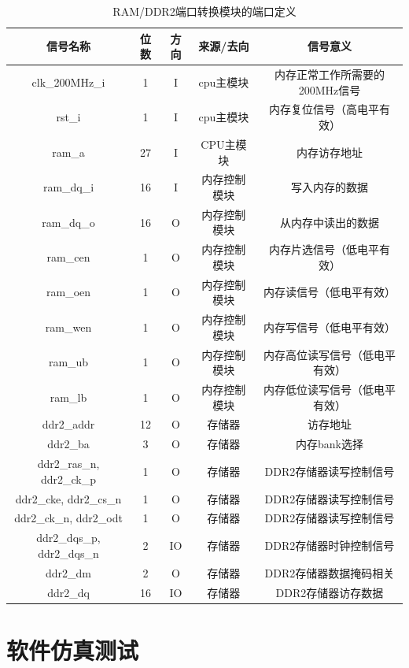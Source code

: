 \documentclass[forprint]{WHUBachelor}
\begin{document}
\begin{table}[H]
  \centering
  \begin{tabular}{c c c c c}
    \hline
    信号名称 & 位数 & 方向 & 来源/去向 & 信号意义 \\
    \hline
    clk\_200MHz\_i & 1 & I & cpu主模块 & 内存正常工作所需要的200MHz信号\\
    rst\_i & 1 & I & cpu主模块 & 内存复位信号（高电平有效）\\
    ram\_a & 27 & I & CPU主模块 & 内存访存地址\footnotemark\\
    ram\_dq\_i & 16 & I & 内存控制模块 & 写入内存的数据\\
    ram\_dq\_o & 16 & O & 内存控制模块 & 从内存中读出的数据\\
    ram\_cen & 1 & O & 内存控制模块 & 内存片选信号（低电平有效）\\
    ram\_oen & 1 & O & 内存控制模块 & 内存读信号（低电平有效）\\
    ram\_wen & 1 & O & 内存控制模块 & 内存写信号（低电平有效）\\
    ram\_ub & 1 & O & 内存控制模块 & 内存高位读写信号（低电平有效）\\
    ram\_lb & 1 & O & 内存控制模块 & 内存低位读写信号（低电平有效）\\
    ddr2\_addr & 12 & O & 存储器 & 访存地址 \\
    ddr2\_ba & 3 & O & 存储器 & 内存bank选择\\
    ddr2\_ras\_n, ddr2\_ck\_p & 1 & O & 存储器 & DDR2存储器读写控制信号 \\
    ddr2\_cke, ddr2\_cs\_n & 1 & O & 存储器 & DDR2存储器读写控制信号\\
    ddr2\_ck\_n, ddr2\_odt & 1 & O & 存储器 & DDR2存储器读写控制信号\\
    ddr2\_dqs\_p, ddr2\_dqs\_n & 2 & IO & 存储器 & DDR2存储器时钟控制信号\\
    ddr2\_dm & 2 & O & 存储器 & DDR2存储器数据掩码相关 \\
    ddr2\_dq & 16 & IO & 存储器 & DDR2存储器访存数据 \\
    \hline
  \end{tabular}
  \caption{RAM/DDR2端口转换模块的端口定义}
  \label{tab:ports:ram2ddr}
\end{table}

\chapter{软件仿真测试}
\end{document}
